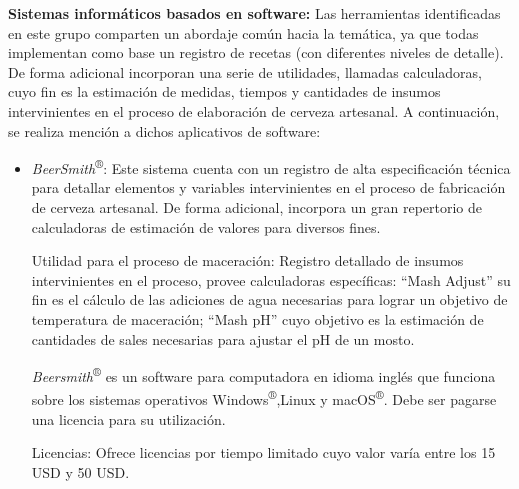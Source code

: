     \par
    \textbf{Sistemas informáticos basados en software:} Las herramientas identificadas en este grupo comparten un abordaje común hacia la temática, ya que todas implementan como base un registro de recetas (con diferentes niveles de detalle). De forma adicional incorporan una serie de utilidades, llamadas calculadoras, cuyo fin es la estimación de medidas, tiempos y cantidades de insumos intervinientes en el proceso de elaboración de cerveza artesanal. A continuación, se realiza mención a dichos aplicativos de software:
    \begin{itemize}
        
        \item {\textit{BeerSmith}\textsuperscript{®}}: Este sistema cuenta con un registro de alta especificación técnica para detallar elementos y variables intervinientes en el proceso de fabricación de cerveza artesanal. De forma adicional, incorpora un gran repertorio de calculadoras de estimación de valores para diversos fines.
        \par
        Utilidad para el proceso de maceración: Registro detallado de insumos intervinientes en el proceso, provee calculadoras específicas: ``Mash Adjust'' su fin es el cálculo de las adiciones de agua necesarias para lograr un objetivo de temperatura de maceración; ``Mash pH'' cuyo objetivo es la estimación de cantidades de sales necesarias para ajustar el pH de un mosto.
        \par
        \textit{Beersmith}\textsuperscript{®} es un software para computadora en idioma inglés que funciona sobre los sistemas operativos Windows\textsuperscript{®},Linux y macOS\textsuperscript{®}. Debe ser pagarse una licencia para su utilización.
        \par
        Licencias: Ofrece licencias por tiempo limitado cuyo valor varía entre los 15 USD y 50 USD.
        

\end{itemize}
